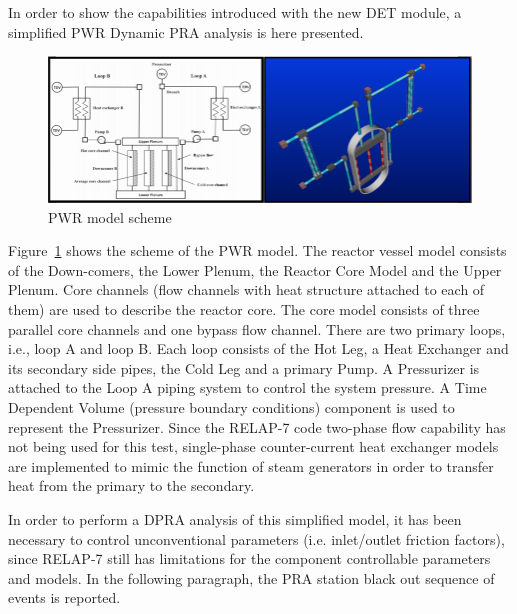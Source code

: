 \label{sec:demo}
In order to show the capabilities introduced with the new DET module, a simplified PWR Dynamic PRA analysis is here presented.
\begin{figure}[h]
   \centering
    \includegraphics[width=1.0\textwidth]{figures/PWR_TMI_SCHEME.PNG}
    \caption{PWR model scheme}
    \label{fig:PWRmodel}
\end{figure}
Figure~\ref{fig:PWRmodel} shows the scheme of the PWR model. The reactor vessel model consists of the Down-comers, the Lower Plenum, the Reactor Core Model and the Upper Plenum. Core channels (flow channels with heat structure attached to each of them) are used to describe the reactor core. The core model consists of three parallel core channels and one bypass flow channel. 
There are two primary loops, i.e., loop A and loop B. Each loop consists of the Hot Leg, a Heat Exchanger and its secondary side pipes, the Cold Leg and a primary Pump. A Pressurizer is attached to the Loop A piping system to control the system pressure. A Time Dependent Volume (pressure boundary conditions) component is used to represent the Pressurizer. Since the RELAP-7 code two-phase flow capability has not being used for this test, single-phase counter-current heat exchanger models are implemented to mimic the function of steam generators in order to transfer heat from the primary to the secondary.

In order to perform a DPRA analysis of this simplified model, it has been necessary to control unconventional parameters (i.e. inlet/outlet friction factors), since RELAP-7 still has limitations for the component controllable parameters and models. In the following paragraph, the PRA station black out sequence of events is reported.
